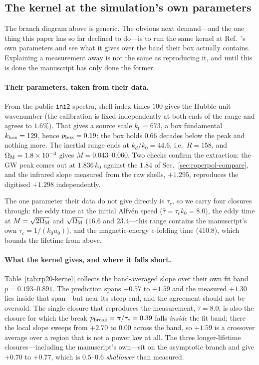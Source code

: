 \documentclass[10pt,prd,aps,nobibnotes,superscriptaddress,preprintnumbers,notitlepage]{revtex4-1}
\newcommand{\add}[1]{{\color{red}#1}}
\newcommand{\add}[1]{#1}
\begin{document}
\add{\subsection{The kernel at the simulation's own parameters}
\label{sec:kernel-at-rp20}

The branch diagram above is generic. The obvious next demand---and the one thing this
paper has so far declined to do---is to run the same kernel at
Ref.~\cite{RoperPol:2019wvy}'s own parameters and see what it gives over the band their
box actually contains. Explaining a measurement away is not the same as reproducing it,
and until this is done the manuscript has only done the former.

\paragraph{Their parameters, taken from their data.} From the public \texttt{ini2}
spectra, shell index times $100$ gives the Hubble-unit wavenumber (the calibration is
fixed independently at both ends of the range and agrees to $1.6\%$). That gives a source
scale $k_0=673$, a box fundamental $k_{\rm box}=129$, hence $p_{\rm box}=0.19$: the box
holds $0.66$ decades below the peak and nothing more. The inertial range ends at
$k_d/k_0=44.6$, i.e.\ $R=158$, and $\Omega_{\rm M}=1.8\times10^{-3}$ gives $M=0.043$--$0.060$.
Two checks confirm the extraction: the GW peak comes out at $1.836\,k_0$ against the
$1.84$ of Sec.~\ref{sec:roperpol-compare}, and the infrared slope measured from the raw
shells, $+1.295$, reproduces the digitised $+1.298$ independently.

The one parameter their data do not give directly is $\tau_c$, so we carry four closures
through: the eddy time at the initial Alfv\'en speed ($\hat\tau=\tau_ck_0=8.0$), the eddy
time at $M=\sqrt{2\Omega_{\rm M}}$ and $\sqrt{\Omega_{\rm M}}$ ($16.6$ and $23.4$---this
range contains the manuscript's own $\tau_c=1/(k_0u_0)$), and the magnetic-energy
$e$-folding time ($410.8$), which bounds the lifetime from above.

\paragraph{What the kernel gives, and where it falls short.} Table~\ref{tab:rp20-kernel}
collects the band-averaged slope over their own fit band $p=0.193$--$0.891$. The
prediction spans $+0.57$ to $+1.59$ and the measured $+1.30$ lies inside that span---but
near its steep end, and the agreement should not be oversold. The single closure that
reproduces the measurement, $\hat\tau=8.0$, is also the closure for which the break
$p_{\rm break}=\pi/\tau_c=0.39$ falls \emph{inside} the fit band; there the local slope
sweeps from $+2.70$ to $0.00$ across the band, so $+1.59$ is a crossover average over a
region that is not a power law at all. The three longer-lifetime closures---including the
manuscript's own---sit on the asymptotic branch and give $+0.70$ to $+0.77$, which is
$0.5$--$0.6$ \emph{shallower} than measured.

}
\end{document}
